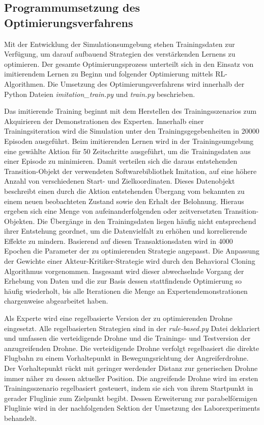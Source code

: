 \subsection{Programmumsetzung des Optimierungsverfahrens}

Mit der Entwicklung der Simulationsumgebung stehen Trainingsdaten zur Verfügung, um darauf aufbauend Strategien des verstärkenden Lernens zu optimieren.
Der gesamte Optimierungsprozess unterteilt sich in den Einsatz von imitierendem Lernen zu Beginn und folgender Optimierung mittels RL-Algorithmen. 
Die Umsetzung des Optimierungsverfahrens wird innerhalb der Python Dateien \textit{imitation\_train.py} und \textit{train.py} beschrieben.

Das imitierende Training beginnt mit dem Herstellen des Trainingsszenarios zum Akquirieren der Demonstrationen des Experten. 
Innerhalb einer Trainingsiteration wird die Simulation unter den Trainingsgegebenheiten in 20000 Episoden ausgeführt.
Beim imitierenden Lernen wird in der Trainingsumgebung eine gewählte Aktion für 50 Zeitschritte ausgeführt, um die Trainingsdaten aus einer Episode zu minimieren.
Damit verteilen sich die daraus entstehenden Transition-Objekt der verwendeten Softwarebibliothek Imitation, auf eine höhere Anzahl von verschiedenen Start- und Zielkoordinaten.
Dieses Datenobjekt beschreibt einen durch die Aktion entstehenden Übergang vom bekannten zu einem neuen beobachteten Zustand sowie den Erhalt der Belohnung.
Hieraus ergeben sich eine Menge von aufeinanderfolgenden oder zeitversetzten Transition-Objekten.
Die Übergänge in den Trainingsdaten liegen häufig nicht entsprechend ihrer Entstehung geordnet, um die Datenvielfalt zu erhöhen und korrelierende Effekte zu mindern. 
Basierend auf diesen Transaktionsdaten wird in 4000 Epochen die Parameter der zu optimierenden Strategie angepasst.
Die Anpassung der Gewichte einer Akteur-Kritiker-Strategie wird durch den Behavioral Cloning Algorithmus vorgenommen.
Insgesamt wird dieser abwechselnde Vorgang der Erhebung von Daten und die zur Basis dessen stattfindende Optimierung so häufig wiederholt, bis alle Iterationen die Menge an Expertendemonstrationen chargenweise abgearbeitet haben.

Als Experte wird eine regelbasierte Version der zu optimierenden Drohne eingesetzt. 
Alle regelbasierten Strategien sind in der \textit{rule-based.py} Datei deklariert und umfassen die verteidigende Drohne und die Trainings- und Testversion der anzugreifenden Drohne.
Die verteidigende Drohne verfolgt regelbasiert die direkte Flugbahn zu einem Vorhaltepunkt in Bewegungsrichtung der Angreiferdrohne.
Der Vorhaltepunkt rückt mit geringer werdender Distanz zur generischen Drohne immer näher zu dessen aktueller Position.
Die angreifende Drohne wird im ersten Trainingsszenario regelbasiert gesteuert, indem sie sich von ihrem Startpunkt in gerader Fluglinie zum Zielpunkt begibt.
Dessen Erweiterung zur parabelförmigen Fluglinie wird in der nachfolgenden Sektion der Umsetzung des Laborexperiments behandelt. 

